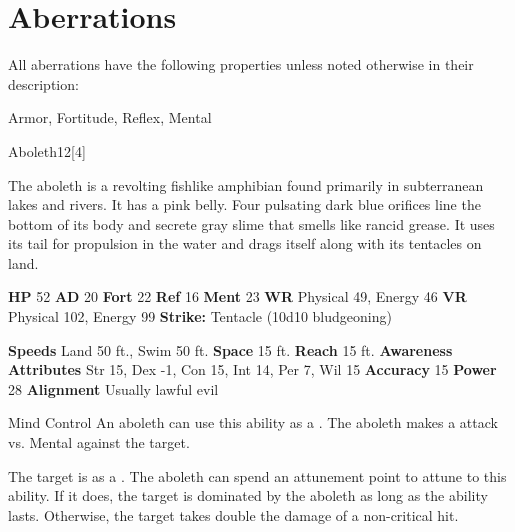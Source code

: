 
        \section{Aberrations}

        All aberrations have the following properties unless noted otherwise in their description:
        
    
     Armor,
     Fortitude,
     Reflex,
     Mental
  
  
      
  \begin{monsection}{Aboleth}{12}[4]
    \vspace{-1em}\vspace{-1em}
    \vspace{0em}

    
    The aboleth is a revolting fishlike amphibian found primarily in subterranean lakes and rivers.
    It has a pink belly.
    Four pulsating dark blue orifices line the bottom of its body and secrete gray slime that smells like rancid grease.
    It uses its tail for propulsion in the water and drags itself along with its tentacles on land.
  
    

    \begin{spellcontent}
      \begin{spelltargetinginfo}
        \pari \textbf{HP} 52 \monsep
          \textbf{AD} 20 \monsep
          \textbf{Fort} 22 \monsep
          \textbf{Ref} 16 \monsep
          \textbf{Ment} 23
        \pari \textbf{WR} Physical 49, Energy 46 \monsep
        \textbf{VR} Physical 102, Energy 99
        \pari \textbf{Strike:}
            Tentacle  (10d10 bludgeoning)
      \end{spelltargetinginfo}
    \end{spellcontent}
    \begin{monsterfooter}
      \pari \textbf{Speeds} Land 50 ft., Swim 50 ft. \monsep
        \textbf{Space} 15 ft. \monsep
        \textbf{Reach} 15 ft.
      \pari \textbf{Awareness} 
      \pari \textbf{Attributes}
        Str 15, Dex -1,
        Con 15, Int 14,
        Per 7, Wil 15
      \pari \textbf{Accuracy} 15 \monsep
        \textbf{Power} 28
      \pari \textbf{Alignment} Usually lawful evil
    \end{monsterfooter}
  \end{monsection}
  \begin{freeability}{Mind Control}
      An aboleth can use this ability as a . The aboleth makes a  attack
        vs. Mental against the target.
    
    \hit The target is  as a .
    \crit 
        The aboleth can spend an attunement point to attune to this ability.
        If it does, the target is dominated by the aboleth as long as the ability lasts.
        Otherwise, the target takes double the damage of a non-critical hit.
    \end{freeability}
  

